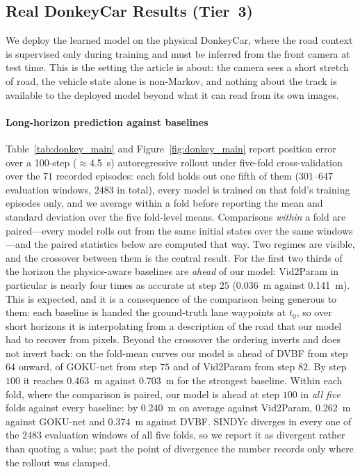 \documentclass[preprint,12pt]{elsarticle}
\begin{document}
\subsection{Real DonkeyCar Results (Tier~3)}\label{sec:donkeyreal_results}

We deploy the learned model on the physical DonkeyCar, where the road context is
supervised only during training and must be inferred from the front camera at
test time.
This is the setting the article is about: the camera sees a short stretch of road,
the vehicle state alone is non-Markov, and nothing about the track is available to
the deployed model beyond what it can read from its own images.

\paragraph{Long-horizon prediction against baselines}
Table~\ref{tab:donkey_main} and Figure~\ref{fig:donkey_main} report position error
over a 100-step ($\approx$\SI{4.5}{s}) autoregressive rollout under five-fold
cross-validation over the $71$ recorded episodes: each fold holds out one fifth of
them ($301$--$647$ evaluation windows, $2483$ in total), every model is trained on
that fold's training episodes only, and we average within a fold before reporting
the mean and standard deviation over the five fold-level means. Comparisons \emph{within} a
fold are paired---every model rolls out from the same initial states over the same
windows---and the paired statistics below are computed that way.
Two regimes are visible, and the crossover between them is the central result.
For the first two thirds of the horizon the physics-aware baselines are
\emph{ahead} of our model: Vid2Param in particular is nearly four times as accurate
at step $25$ (\SI{0.036}{m} against \SI{0.141}{m}).
This is expected, and it is a consequence of the comparison being generous to
them: each baseline is handed the ground-truth lane waypoints at $t_0$, so over
short horizons it is interpolating from a description of the road that our model
had to recover from pixels.
Beyond the crossover the ordering inverts and does not invert back: on the
fold-mean curves our model is ahead of DVBF from step $64$ onward, of GOKU-net from
step $75$ and of Vid2Param from step $82$.
By step $100$ it reaches \SI{0.463}{m} against \SI{0.703}{m} for the
strongest baseline. Within each fold, where the comparison is paired, our model is
ahead at step $100$ in \emph{all five} folds against every baseline: by
\SI{0.240}{m} on average against Vid2Param, \SI{0.262}{m} against GOKU-net and
\SI{0.374}{m} against DVBF.
SINDYc diverges in every one of the $2483$ evaluation windows of all five folds, so
we report it as divergent rather than quoting a value; past the point of divergence
the number records only where the rollout was clamped.
\end{document}
